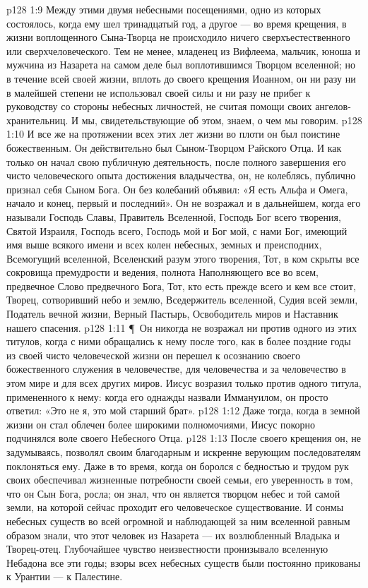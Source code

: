 \vs p128 1:9 Между этими двумя небесными посещениями, одно из которых состоялось, когда ему шел тринадцатый год, а другое --- во время крещения, в жизни воплощенного Сына\hyp{}Творца не происходило ничего сверхъестественного или сверхчеловеческого. Тем не менее, младенец из Вифлеема, мальчик, юноша и мужчина из Назарета на самом деле был воплотившимся Творцом вселенной; но в течение всей своей жизни, вплоть до своего крещения Иоанном, он ни разу ни в малейшей степени не использовал своей силы и ни разу не прибег к руководству со стороны небесных личностей, не считая помощи своих ангелов\hyp{}хранительниц. И мы, свидетельствующие об этом, знаем, о чем мы говорим.
\vs p128 1:10 И все же на протяжении всех этих лет жизни во плоти он был поистине божественным. Он действительно был Сыном\hyp{}Творцом Pайского Отца. И как только он начал свою публичную деятельность, после полного завершения его чисто человеческого опыта достижения владычества, он, не колеблясь, публично признал себя Сыном Бога. Он без колебаний объявил: «Я есть Альфа и Омега, начало и конец, первый и последний». Он не возражал и в дальнейшем, когда его называли Господь Славы, Правитель Вселенной, Господь Бог всего творения, Святой Израиля, Господь всего, Господь мой и Бог мой, с нами Бог, имеющий имя выше всякого имени и всех колен небесных, земных и преисподних, Всемогущий вселенной, Вселенский разум этого творения, Тот, в ком скрыты все сокровища премудрости и ведения, полнота Наполняющего все во всем, предвечное Слово предвечного Бога, Тот, кто есть прежде всего и кем все стоит, Творец, сотворивший небо и землю, Вседержитель вселенной, Судия всей земли, Податель вечной жизни, Верный Пастырь, Освободитель миров и Наставник нашего спасения.
\vs p128 1:11 \P\ Он никогда не возражал ни против одного из этих титулов, когда с ними обращались к нему после того, как в более поздние годы из своей чисто человеческой жизни он перешел к осознанию своего божественного служения в человечестве, для человечества и за человечество в этом мире и для всех других миров. Иисус возразил только против одного титула, примененного к нему: когда его однажды назвали Иммануилом, он просто ответил: «Это не я, это мой старший брат».
\vs p128 1:12 Даже тогда, когда в земной жизни он стал облечен более широкими полномочиями, Иисус покорно подчинялся воле своего Небесного Отца.
\vs p128 1:13 После своего крещения он, не задумываясь, позволял своим благодарным и искренне верующим последователям поклоняться ему. Даже в то время, когда он боролся с бедностью и трудом рук своих обеспечивал жизненные потребности своей семьи, его уверенность в том, что он Сын Бога, росла; он знал, что он является творцом небес и той самой земли, на которой сейчас проходит его человеческое существование. И сонмы небесных существ во всей огромной и наблюдающей за ним вселенной равным образом знали, что этот человек из Назарета --- их возлюбленный Владыка и Творец\hyp{}отец. Глубочайшее чувство неизвестности пронизывало вселенную Небадона все эти годы; взоры всех небесных существ были постоянно прикованы к Урантии --- к Палестине.
